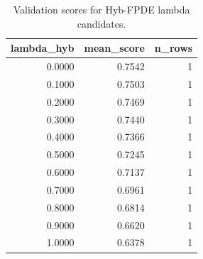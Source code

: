 \begin{table}[t]
\caption{Validation scores for Hyb-FPDE lambda candidates.}
\label{tab:lambda_distribution_computed}
\centering
\begin{tabular}{rrr}
\toprule
lambda\_hyb & mean\_score & n\_rows \\
\midrule
0.0000 & 0.7542 & 1 \\
0.1000 & 0.7503 & 1 \\
0.2000 & 0.7469 & 1 \\
0.3000 & 0.7440 & 1 \\
0.4000 & 0.7366 & 1 \\
0.5000 & 0.7245 & 1 \\
0.6000 & 0.7137 & 1 \\
0.7000 & 0.6961 & 1 \\
0.8000 & 0.6814 & 1 \\
0.9000 & 0.6620 & 1 \\
1.0000 & 0.6378 & 1 \\
\bottomrule
\end{tabular}

\end{table}
